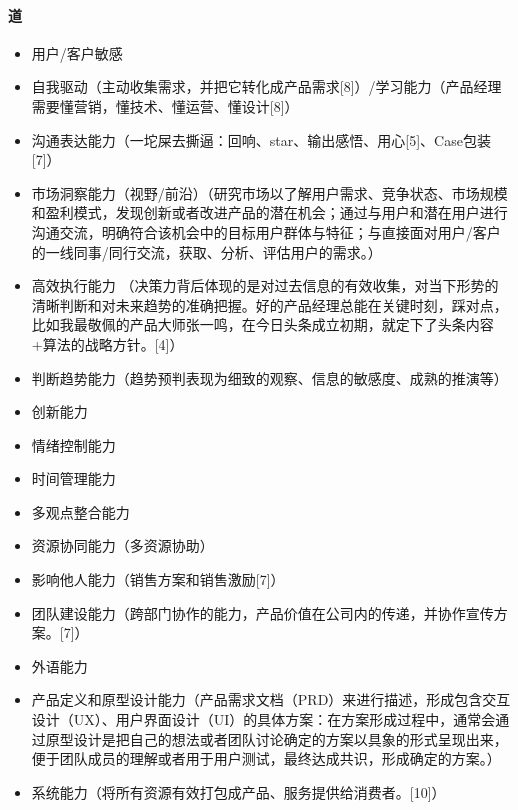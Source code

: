 \documentclass[letterpaper,11pt,english]{sphinxmanual}
\begin{document}
\paragraph{道}
\label{\detokenize{chapter_introduction/ability:id4}}\begin{itemize}
\item {} 
用户/客户敏感

\item {} 
自我驱动（主动收集需求，并把它转化成产品需求{[}8{]}）/学习能力（产品经理需要懂营销，懂技术、懂运营、懂设计{[}8{]}）

\item {} 
沟通表达能力（一坨屎去撕逼：回响、star、输出感悟、用心{[}5{]}、Case包装{[}7{]}）

\item {} 
市场洞察能力（视野/前沿）（研究市场以了解用户需求、竞争状态、市场规模和盈利模式，发现创新或者改进产品的潜在机会；通过与用户和潜在用户进行沟通交流，明确符合该机会中的目标用户群体与特征；与直接面对用户/客户的一线同事/同行交流，获取、分析、评估用户的需求。）

\item {} 
高效执行能力
（决策力背后体现的是对过去信息的有效收集，对当下形势的清晰判断和对未来趋势的准确把握。好的产品经理总能在关键时刻，踩对点，比如我最敬佩的产品大师张一鸣，在今日头条成立初期，就定下了头条内容+算法的战略方针。{[}4{]}）

\item {} 
判断趋势能力（趋势预判表现为细致的观察、信息的敏感度、成熟的推演等）

\item {} 
创新能力

\item {} 
情绪控制能力

\item {} 
时间管理能力

\item {} 
多观点整合能力

\item {} 
资源协同能力（多资源协助）

\item {} 
影响他人能力（销售方案和销售激励{[}7{]}）

\item {} 
团队建设能力（跨部门协作的能力，产品价值在公司内的传递，并协作宣传方案。{[}7{]}）

\item {} 
外语能力

\item {} 
产品定义和原型设计能力（产品需求文档（PRD）来进行描述，形成包含交互设计（UX）、用户界面设计（UI）的具体方案：在方案形成过程中，通常会通过原型设计是把自己的想法或者团队讨论确定的方案以具象的形式呈现出来，便于团队成员的理解或者用于用户测试，最终达成共识，形成确定的方案。）

\item {} 
系统能力（将所有资源有效打包成产品、服务提供给消费者。{[}10{]}）

\end{itemize}
\end{document}

